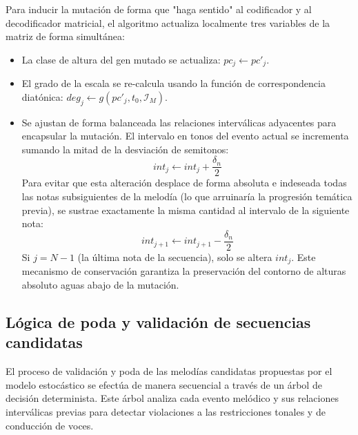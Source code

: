 \begin{enumerate}
    Para inducir la mutación de forma que "haga sentido" al codificador y al decodificador matricial, el algoritmo actualiza localmente tres variables de la matriz de forma simultánea:
    \begin{itemize}
        \item La clase de altura del gen mutado se actualiza: $pc_j \leftarrow pc'_j$.
        \item El grado de la escala se re-calcula usando la función de correspondencia diatónica: $deg_j \leftarrow g(pc'_j, t_0, \mathcal{I}_M)$.
        \item Se ajustan de forma balanceada las relaciones interválicas adyacentes para encapsular la mutación. El intervalo en tonos del evento actual se incrementa sumando la mitad de la desviación de semitonos:
        \begin{equation}
            int_j \leftarrow int_j + \frac{\delta_n}{2}
        \end{equation}
        Para evitar que esta alteración desplace de forma absoluta e indeseada todas las notas subsiguientes de la melodía (lo que arruinaría la progresión temática previa), se sustrae exactamente la misma cantidad al intervalo de la siguiente nota:
        \begin{equation}
            int_{j+1} \leftarrow int_{j+1} - \frac{\delta_n}{2}
        \end{equation}
        Si $j = N-1$ (la última nota de la secuencia), solo se altera $int_j$. Este mecanismo de conservación garantiza la preservación del contorno de alturas absoluto aguas abajo de la mutación.
    \end{itemize}
\end{enumerate}

\subsection{Lógica de poda y validación de secuencias candidatas}

El proceso de validación y poda de las melodías candidatas propuestas por el modelo estocástico se efectúa de manera secuencial a través de un árbol de decisión determinista. Este árbol analiza cada evento melódico y sus relaciones interválicas previas para detectar violaciones a las restricciones tonales y de conducción de voces.

